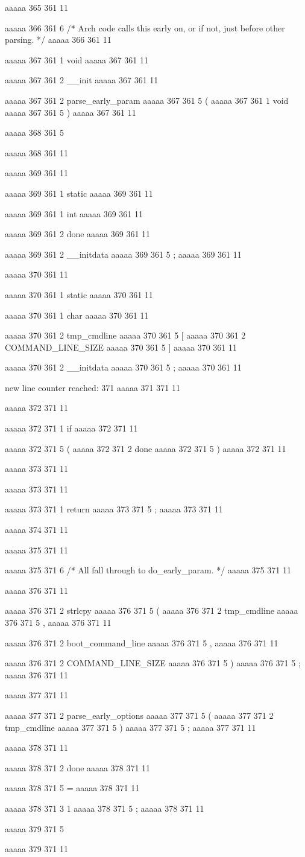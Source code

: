 aaaaa 365 361
11


aaaaa 366 361
6
/* Arch code calls this early on, or if not, just before other parsing. */
aaaaa 366 361
11


aaaaa 367 361
1
void
aaaaa 367 361
11
 
aaaaa 367 361
2
__init
aaaaa 367 361
11
 
aaaaa 367 361
2
parse_early_param
aaaaa 367 361
5
(
aaaaa 367 361
1
void
aaaaa 367 361
5
)
aaaaa 367 361
11


aaaaa 368 361
5
{
aaaaa 368 361
11


aaaaa 369 361
11
	
aaaaa 369 361
1
static
aaaaa 369 361
11
 
aaaaa 369 361
1
int
aaaaa 369 361
11
 
aaaaa 369 361
2
done
aaaaa 369 361
11
 
aaaaa 369 361
2
__initdata
aaaaa 369 361
5
;
aaaaa 369 361
11


aaaaa 370 361
11
	
aaaaa 370 361
1
static
aaaaa 370 361
11
 
aaaaa 370 361
1
char
aaaaa 370 361
11
 
aaaaa 370 361
2
tmp_cmdline
aaaaa 370 361
5
[
aaaaa 370 361
2
COMMAND_LINE_SIZE
aaaaa 370 361
5
]
aaaaa 370 361
11
 
aaaaa 370 361
2
__initdata
aaaaa 370 361
5
;
aaaaa 370 361
11


new line counter reached: 371
aaaaa 371 371
11


aaaaa 372 371
11
	
aaaaa 372 371
1
if
aaaaa 372 371
11
 
aaaaa 372 371
5
(
aaaaa 372 371
2
done
aaaaa 372 371
5
)
aaaaa 372 371
11


aaaaa 373 371
11
	
aaaaa 373 371
11
	
aaaaa 373 371
1
return
aaaaa 373 371
5
;
aaaaa 373 371
11


aaaaa 374 371
11


aaaaa 375 371
11
	
aaaaa 375 371
6
/* All fall through to do_early_param. */
aaaaa 375 371
11


aaaaa 376 371
11
	
aaaaa 376 371
2
strlcpy
aaaaa 376 371
5
(
aaaaa 376 371
2
tmp_cmdline
aaaaa 376 371
5
,
aaaaa 376 371
11
 
aaaaa 376 371
2
boot_command_line
aaaaa 376 371
5
,
aaaaa 376 371
11
 
aaaaa 376 371
2
COMMAND_LINE_SIZE
aaaaa 376 371
5
)
aaaaa 376 371
5
;
aaaaa 376 371
11


aaaaa 377 371
11
	
aaaaa 377 371
2
parse_early_options
aaaaa 377 371
5
(
aaaaa 377 371
2
tmp_cmdline
aaaaa 377 371
5
)
aaaaa 377 371
5
;
aaaaa 377 371
11


aaaaa 378 371
11
	
aaaaa 378 371
2
done
aaaaa 378 371
11
 
aaaaa 378 371
5
=
aaaaa 378 371
11
 
aaaaa 378 371
3
1
aaaaa 378 371
5
;
aaaaa 378 371
11


aaaaa 379 371
5
}
aaaaa 379 371
11


